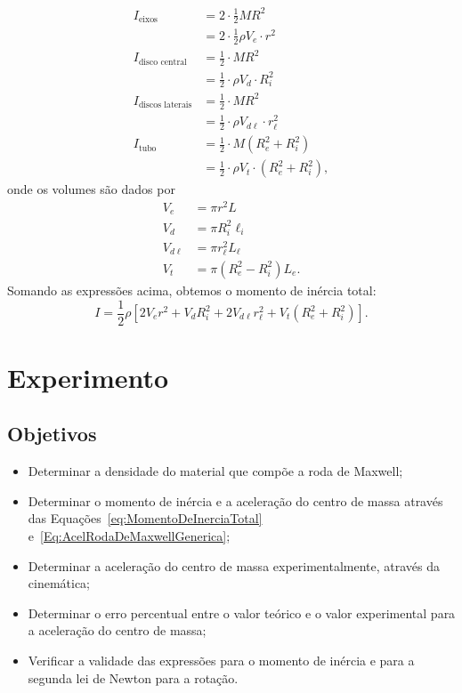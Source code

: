 %
\begin{align}
    I_{\text{eixos}} &= 2\cdot\frac{1}{2} MR^2 \\
    &=2\cdot \frac{1}{2} \rho V_e \cdot r^2 \\
    I_{\text{disco central}} &= \frac{1}{2} \cdot MR^2 \\
    &= \frac{1}{2} \cdot\rho V_d \cdot R_i^2 \\
    I_{\text{discos laterais}} &= \frac{1}{2} \cdot MR^2 \\
    &= \frac{1}{2} \cdot\rho V_{d\ell} \cdot r_{\ell}^2 \\
    I_{\text{tubo}} &= \frac{1}{2} \cdot M (R_e^2 + R_i^2) \\
    &= \frac{1}{2} \cdot \rho V_t \cdot (R_e^2 + R_i^2),
\end{align}
%
onde os volumes são dados por
\begin{align}
    V_e &= \pi r^2 L \\
    V_d &= \pi R_i^2 \ell_i \\
    V_{d\ell} &= \pi r_\ell^2 L_\ell\\
    V_t &= \pi (R_e^2 - R_i^2)L_e.
\end{align}
%
Somando as expressões acima, obtemos o momento de inércia total:
\begin{equation}\label{eq:MomentoDeInerciaTotal}
    I = \frac{1}{2} \rho [2V_e r^2 + V_d R_i^2 + 2 V_{d\ell} r_ \ell^2+ V_t (R_e^2 + R_i^2)].
\end{equation}

\section{Experimento}

\subsection{Objetivos}
\label{Sec:ObjetivosRodaDeMaxwell}

\begin{itemize}
	\item Determinar a densidade do material que compõe a roda de Maxwell;
	\item Determinar o momento de inércia e a aceleração do centro de massa através das Equações~\eqref{eq:MomentoDeInerciaTotal} e~\eqref{Eq:AcelRodaDeMaxwellGenerica};
	\item Determinar a aceleração do centro de massa experimentalmente, através da cinemática;
    \item Determinar o erro percentual entre o valor teórico e o valor experimental para a aceleração do centro de massa;
    \item Verificar a validade das expressões para o momento de inércia e para a segunda lei de Newton para a rotação.
\end{itemize}

